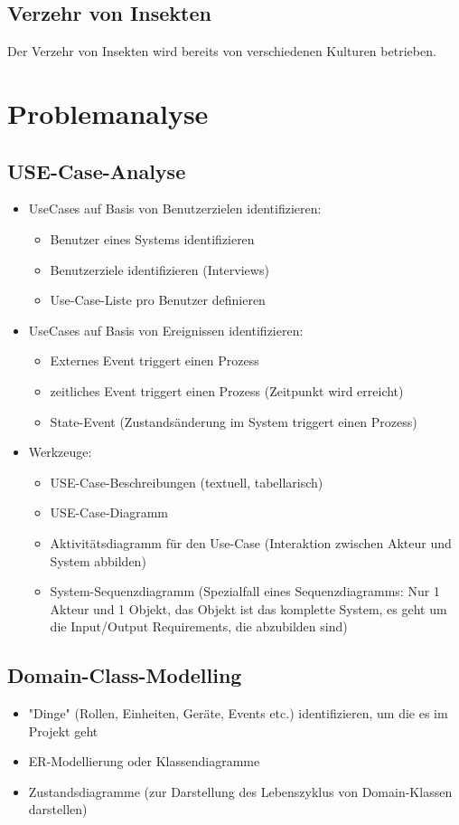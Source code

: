 \section{Verzehr von Insekten}
Der Verzehr von Insekten wird bereits von verschiedenen Kulturen betrieben. 

\chapter{Problemanalyse}
\section{USE-Case-Analyse}
\begin{itemize}
	\item UseCases auf Basis von Benutzerzielen identifizieren: 
	\begin{itemize}
		\item Benutzer eines Systems identifizieren
		\item Benutzerziele identifizieren (Interviews)
		\item Use-Case-Liste pro Benutzer definieren
	\end{itemize}
	\item UseCases auf Basis von Ereignissen identifizieren: 
	\begin{itemize}
		\item Externes Event triggert einen Prozess
		\item zeitliches Event triggert einen Prozess (Zeitpunkt wird erreicht) 
		\item State-Event (Zustandsänderung im System triggert einen Prozess)
	\end{itemize}
	\item Werkzeuge:
	\begin{itemize}
		\item USE-Case-Beschreibungen (textuell, tabellarisch)
		\item USE-Case-Diagramm
		\item Aktivitätsdiagramm für den Use-Case (Interaktion zwischen Akteur und System abbilden)
		\item System-Sequenzdiagramm (Spezialfall eines Sequenzdiagramms: Nur 1 Akteur und 1 Objekt, das Objekt ist das komplette System, es geht um die Input/Output Requirements, die abzubilden sind)
	\end{itemize}
\end{itemize}

\section{Domain-Class-Modelling}
\begin{itemize}
	\item "Dinge" (Rollen, Einheiten, Geräte, Events etc.) identifizieren, um die es im Projekt geht
	\item ER-Modellierung oder Klassendiagramme
	\item Zustandsdiagramme (zur Darstellung des Lebenszyklus von Domain-Klassen darstellen)
\end{itemize}

